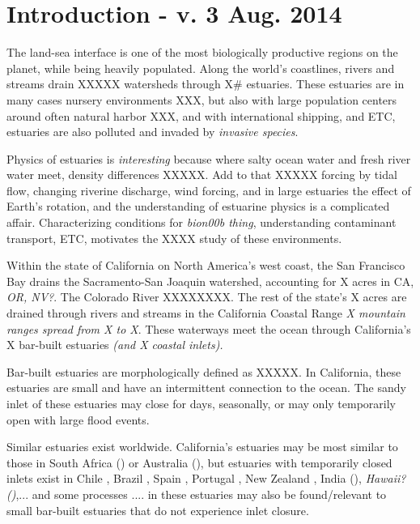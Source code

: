 \chapter{Introduction - v. 3 Aug. 2014}
\label{chIntro}

The land-sea interface is one of the most biologically productive regions on the planet, while being heavily populated. Along the world's coastlines, rivers and streams drain XXXXX watersheds through X\# estuaries.  These estuaries are in many cases nursery environments XXX, but also with large population centers around often natural harbor XXX, and with international shipping, and ETC, estuaries are also polluted and invaded by \emph{invasive species}. 

Physics of estuaries is \emph{interesting} because where salty ocean water and fresh river water meet, density differences XXXXX. Add to that XXXXX forcing by tidal flow, changing riverine discharge, wind forcing, and in large estuaries the effect of Earth's rotation, and the understanding of estuarine physics is a complicated affair. Characterizing conditions for \emph{bion00b thing}, understanding contaminant transport, ETC, motivates the XXXX study of these environments. 

Within the state of California on North America's west coast, the San Francisco Bay drains the Sacramento-San Joaquin watershed, accounting for X acres in CA, \emph{OR, NV?}. The Colorado River XXXXXXXX. The rest of the state's X acres are drained through rivers and streams in the California Coastal Range \emph{X mountain ranges spread from X to X}. These waterways meet the ocean through California's X bar-built estuaries \emph{(and X coastal inlets).}

Bar-built estuaries are morphologically defined as XXXXX. In California, these estuaries are small and have an intermittent connection to the ocean. The sandy inlet of these estuaries may close for days, seasonally, or may only temporarily open with large flood events. 

Similar estuaries exist worldwide. California's estuaries may be most similar to those in South Africa () or Australia (), but estuaries with temporarily closed inlets exist in Chile \parencite{dussaillant_water_2009}, Brazil \parencite{suzuki_effects_1998}, Spain \parencite{moreno_morphodynamics_2010}, Portugal \parencite{fortunato_morphological_2014}, New Zealand \parencite{schallenberg_contrasting_2010}, India (), \emph{Hawaii?()},... and some processes .... in these estuaries may also be found/relevant to small bar-built estuaries that do not experience inlet closure. 


